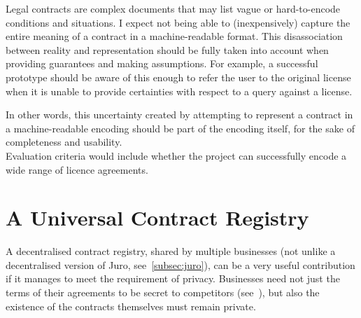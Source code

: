 Legal contracts are complex documents that may list vague or hard-to-encode conditions and
situations.
I expect not being able to (inexpensively) capture the entire meaning of a contract in a
machine-readable format.
This disassociation between reality and representation should be fully taken into account when
providing guarantees and making assumptions.
For example, a successful prototype should be aware of this enough to refer the user to the original
license when it is unable to provide certainties with respect to a query against a license.

In other words, this uncertainty created by attempting to represent a contract in a machine-readable
encoding should be part of the encoding itself, for the sake of completeness and usability.\\

Evaluation criteria would include whether the project can successfully encode a wide range of
licence agreements.


\section{A Universal Contract Registry}\label{sec:contract-registry}

A decentralised contract registry, shared by multiple businesses (not unlike a decentralised version
of Juro, see~\ref{subsec:juro}), can be a very useful contribution if it manages to meet the
requirement of privacy.
Businesses need not just the terms of their agreements to be secret to competitors
(see~\cite[]{economistIU2016licence}), but also the existence of the contracts
themselves must remain private.
